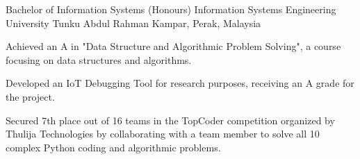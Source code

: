 

\begin{cventries}

  \cventry
    {Bachelor of Information Systems (Honours) Information Systems Engineering} %
    {University Tunku Abdul Rahman} %
    {Kampar, Perak, Malaysia} %
    {} %
    {
      \begin{cvitems} %
        \item {Achieved an A in "Data Structure and Algorithmic Problem Solving", a course focusing on data structures and algorithms.}
        \item {Developed an IoT Debugging Tool for research purposes, receiving an A grade for the project.}
        \item {Secured 7th place out of 16 teams in the TopCoder competition organized by Thulija Technologies by collaborating with a team member to solve all 10 complex Python coding and algorithmic problems.}
      \end{cvitems}
    }
\end{cventries}
